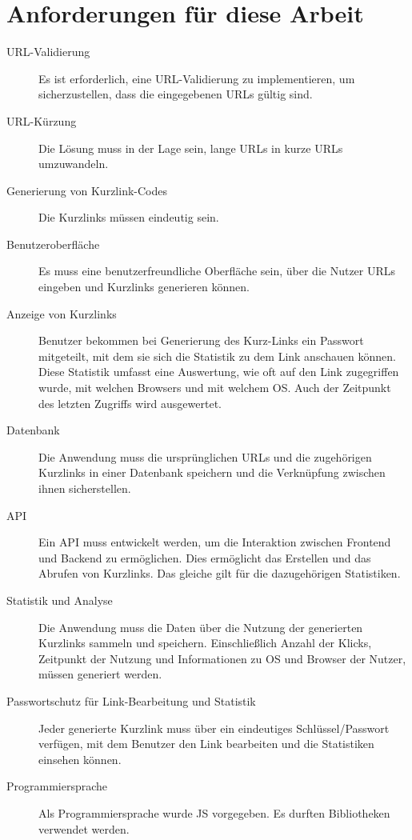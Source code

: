 \documentclass[a4paper,11pt,DIV=12,overfullrule=on]{scrreprt}%
\begin{document}
\section{Anforderungen für diese Arbeit}
\begin{description}
    \item[URL-Validierung] Es ist erforderlich, eine \ac{URL}-Validierung zu implementieren, um sicherzustellen, dass die eingegebenen \ac{URL}s gültig sind.
    \item[URL-Kürzung] Die Lösung muss in der Lage sein, lange \ac{URL}s in kurze \ac{URL}s umzuwandeln.
    \item[Generierung von Kurzlink-Codes] Die Kurzlinks müssen eindeutig sein.
    \item[Benutzeroberfläche] Es muss eine benutzerfreundliche Oberfläche sein, über die Nutzer \ac{URL}s eingeben und Kurzlinks generieren können.
    \item[Anzeige von Kurzlinks] Benutzer bekommen bei Generierung des Kurz-Links ein Passwort mitgeteilt, mit dem sie sich die Statistik zu dem Link anschauen können. Diese Statistik umfasst eine Auswertung, wie oft auf den Link zugegriffen wurde, mit welchen Browsers und mit welchem \ac{OS}. Auch der Zeitpunkt des letzten Zugriffs wird ausgewertet.
    \item[Datenbank] Die Anwendung muss die ursprünglichen \ac{URL}s und die zugehörigen Kurzlinks in einer Datenbank speichern und die Verknüpfung zwischen ihnen sicherstellen.
    \item[API] Ein \ac{API} muss entwickelt werden, um die Interaktion zwischen Frontend und Backend zu ermöglichen. Dies ermöglicht das Erstellen und das Abrufen von Kurzlinks. Das gleiche gilt für die dazugehörigen Statistiken.
    \item[Statistik und Analyse] Die Anwendung muss die Daten über die Nutzung der generierten Kurzlinks sammeln und speichern. Einschließlich Anzahl der Klicks, Zeitpunkt der Nutzung und Informationen zu \ac{OS} und Browser der Nutzer, müssen generiert werden.
    \item[Passwortschutz für Link-Bearbeitung und Statistik] Jeder generierte Kurzlink muss über ein eindeutiges Schlüssel/Passwort verfügen, mit dem Benutzer den Link bearbeiten und die Statistiken einsehen können.
    \item[Programmiersprache] Als Programmiersprache wurde \ac{JS} vorgegeben. Es durften Bibliotheken verwendet werden.
\end{description}
\end{document}
